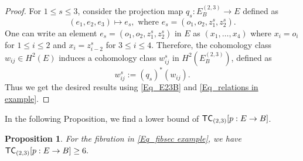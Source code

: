 \documentclass[12pt,oneside,reqno]{amsart}
\theoremstyle{plain}
\newtheorem{proposition}[theorem]{Proposition}
\theoremstyle{definition}
\theoremstyle{remark}
\newcommand{\TC}{{\sf {TC}}}
\begin{document}
\begin{proof} 
For $1\leq s\leq 3$, consider the projection map $q_s: E_B^{(2, 3)} \to E$  defined as $$(e_1,e_2,e_3)\mapsto e_s, \text{ where } e_s = (o_1, o_2, z^s_1, z^s_2).$$ 
One can write an element $e_s = (o_1, o_2, z^s_1, z^s_2)$ in $E$ as $(x_1, \ldots, x_4)$ where $x_i = o_i$ for $1\leq i\leq 2$ and $x_i = z^s_{i-2}$ for $3\leq i \leq 4$. Therefore, the cohomology class $w_{ij}\in H^2(E)$ induces a cohomology class $w^s_{ij}$ in $H^2(E_B^{(2,3)})$, defined as $$w^s_{ij} := (q_{s})^*(w_{ij}).$$
Thus we get the desired results using \eqref{Eq_E23B} and \eqref{Eq_relations in example}.
\end{proof}

\noindent In the following Proposition, we find a lower bound of $\TC_{(2, 3)}[p: E \to B]$.

\begin{proposition}
For the fibration in \ref{Eq_fibsec example}, we have $\TC_{(2, 3)}[p: E \to B] \geq 6.$
\end{proposition}
\end{document}
